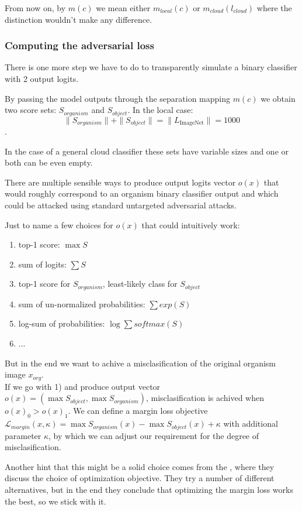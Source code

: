 From now on, by $m(c)$ we mean either $m_{local}(c)$ or $m_{cloud}(l_{cloud})$ where the distinction wouldn't make any difference.

\subsubsection{Computing the adversarial loss}
\label{computing_the_loss}
There is one more step we have to do to transparently simulate a binary classifier with 2 output logits.

By passing the model outputs through the separation mapping $m(c)$ we obtain two score sets: $S_{organism}$ and $S_{object}$. In the local case:
$$\|S_{organism}\| + \|S_{object}\| = \|L_{\text{ImageNet}}\| = 1000$$.

In the case of a general cloud classifier these sets have variable sizes and one or both can be even empty.

There are multiple sensible ways to produce output logits vector $o(x)$ that would roughly correspond to an organism binary classifier output and which could be attacked using standard untargeted adversarial attacks.

Just to name a few choices for $o(x)$ that could intuitively work:
\begin{enumerate}
    \item top-1 score: $\max S$ 
    \item sum of logits: $\sum S$
    \item top-1 score for $S_{organism}$, least-likely class for $S_{object}$
        
    \item sum of un-normalized probabilities: $\sum exp(S)$
    \item log-sum of probabilities: $\log \sum softmax(S)$
    \item ...
\end{enumerate}

But in the end we want to achive a misclasification of the original organism image $x_{org}$. \\ If we go with 1) and produce output vector $o(x) = (\max S_{object}, \max S_{organism})$, misclasification is achived when $o(x)_0 > o(x)_1$. We can define a margin loss objective $\mathcal{L}_{margin}(x, \kappa) = \max S_{organism}(x) - \max S_{object}(x) + \kappa$ with additional parameter $\kappa$, by which we can adjust our requirement for the degree of misclasification.

Another hint that this might be a solid choice comes from the \cite{carlini2017evaluating}, where they discuss the choice of optimization objective. They try a number of different alternatives, but in the end they conclude that optimizing the margin loss works the best, so we stick with it.

